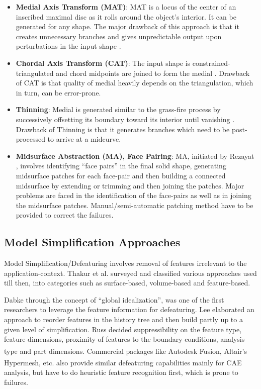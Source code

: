 \begin{itemize}[noitemsep,topsep=2pt,parsep=2pt,partopsep=2pt]%
	\item  \textbf{Medial Axis Transform (MAT)}: MAT is a locus of the center of an inscribed maximal disc as it rolls around the object's interior. It can be generated for any shape. The major drawback of this approach is that it creates unnecessary branches and gives unpredictable output upon perturbations in the input shape \cite{Attali2004}.
	\item \textbf{Chordal Axis Transform (CAT)}: The input shape is constrained-triangulated and chord midpoints are joined to form the medial \cite{QuadrosRoshanOwenBrewerShimada2004}. Drawback of CAT is that quality of medial heavily depends on the triangulation, which in turn, can be error-prone.
	\item \textbf{Thinning}: Medial is generated similar to the grass-ﬁre process by successively oﬀsetting its boundary toward its interior until vanishing \cite{Montanari1969}. Drawback of Thinning is that it generates branches which need to be post-processed to arrive at a midcurve.
	\item \textbf{Midsurface Abstraction (MA), Face Pairing}: MA, initiated by Rezayat \cite{Rezayat1996},  involves identifying ``face pairs'' in the final solid shape, generating midsurface patches for each face-pair and then building a connected midsurface by extending or trimming and then joining the patches. Major problems are faced in the identification of the face-pairs as well as in joining the midsurface patches. Manual/semi-automatic patching method have to be provided to correct the failures.
\end{itemize}

\subsection{Model Simplification Approaches}
 
Model Simplification/Defeaturing involves removal of features irrelevant to the application-context. Thakur et al. \cite{Thakur2009} surveyed and classified various approaches used till then, into categories such as surface-based, volume-based and feature-based.  

Dabke \cite{Dabke1994} through the concept of ``global idealization'', was one of the first researchers to leverage the feature information for defeaturing. Lee \cite{SangHunLee2005} elaborated an approach to reorder features in the history tree and then build partly up to a given level of simplification. Russ \cite{Russ2012} decided suppressibility on the feature type, feature dimensions, proximity of features to the boundary conditions, analysis type and part dimensions. Commercial packages like Autodesk Fusion\textsuperscript{\textregistered}, Altair's Hypermesh\textsuperscript{\textregistered},  etc. also provide similar defeaturing capabilities mainly for CAE analysis, but have to do heuristic feature recognition first, which is prone to failures. 
  
